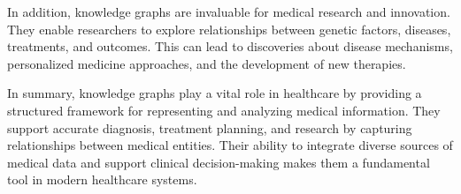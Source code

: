 \begin{itemize}
    In addition, knowledge graphs are invaluable for medical research and innovation. They enable researchers to explore relationships between genetic factors, diseases, treatments, and outcomes. This can lead to discoveries about disease mechanisms, personalized medicine approaches, and the development of new therapies.
    
    In summary, knowledge graphs play a vital role in healthcare by providing a structured framework for representing and analyzing medical information. They support accurate diagnosis, treatment planning, and research by capturing relationships between medical entities. Their ability to integrate diverse sources of medical data and support clinical decision-making makes them a fundamental tool in modern healthcare systems.

\end{itemize}

    

    

